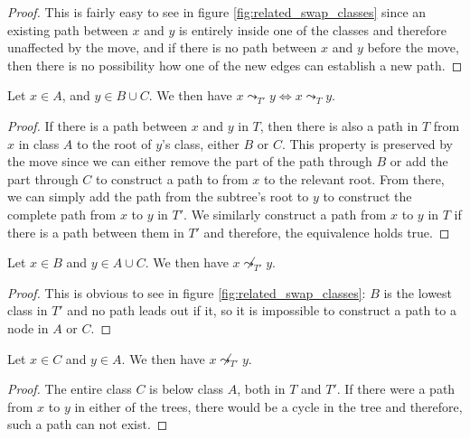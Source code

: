 \begin{proof}
    This is fairly easy to see in figure \ref{fig:related_swap_classes} since an existing path between $x$ and $y$ is entirely inside one of the classes and therefore unaffected by the move, and if there is no path between $x$ and $y$ before the move, then there is no possibility how one of the new edges can establish a new path.
\end{proof}

\begin{lemma}
    \label{lem:related_swap_abc}
    Let $x \in A$, and $y \in B \cup C$. We then have $x \leadsto_{T'} y \Leftrightarrow x \leadsto_T y$.
\end{lemma}

\begin{proof}
    If there is a path between $x$ and $y$ in $T$, then there is also a path in $T$ from $x$ in class $A$ to the root of $y$'s class, either $B$ or $C$. This property is preserved by the move since we can either remove the part of the path through $B$ or add the part through $C$ to construct a path to from $x$ to the relevant root. From there, we can simply add the path from the subtree's root to $y$ to construct the complete path from $x$ to $y$ in $T'$. We similarly construct a path from $x$ to $y$ in $T$ if there is a path between them in $T'$ and therefore, the equivalence holds true.
\end{proof}

\begin{lemma}
    \label{lem:related_swap_bac}
    Let $x \in B$ and $y \in A \cup C$. We then have $x \not\leadsto_{T'} y$.
\end{lemma}

\begin{proof}
    This is obvious to see in figure \ref{fig:related_swap_classes}: $B$ is the lowest class in $T'$ and no path leads out if it, so it is impossible to construct a path to a node in $A$ or $C$.
\end{proof}

\begin{lemma}
    \label{lem:related_swap_ca}
    Let $x \in C$ and $y \in A$. We then have $x \not\leadsto_{T'} y$.
\end{lemma}

\begin{proof}
    The entire class $C$ is below class $A$, both in $T$ and $T'$. If there were a path from $x$ to $y$ in either of the trees, there would be a cycle in the tree and therefore, such a path can not exist.
\end{proof}

